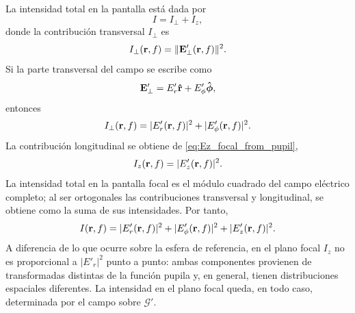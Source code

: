La intensidad total en la pantalla está dada por
\begin{equation}
  I
  =
  I_\perp
  +
  I_z,
  \label{eq:Intensity_in_Focal_Plane_decomp}
\end{equation}
donde la contribución transversal $I_\perp$ es
\begin{equation}
    I_\perp(\vb{r}, f)
    =
    \|\vb{E}'_\perp(\vb{r}, f)\|^2.
\end{equation}
Si la parte transversal del campo se escribe como
\begin{equation}
  \vb E'_\perp
  =
  E'_r \bm{\hat{\mathbf{r}}}
  +
  E'_\phi \bm{\hat{\mathbf{\phi}}} ,
\end{equation}
entonces
\begin{equation}
  I_\perp(\vb r, f)
  =
  |E'_r(\vb r, f)|^2
  +
  |E'_\phi(\vb r, f)|^2 .
\end{equation}
La contribución longitudinal se obtiene de \eqref{eq:Ez_focal_from_pupil},
\begin{equation}
  I_z(\vb r, f)
  =
  |E'_z(\vb r, f)|^2 .
\end{equation}
La intensidad total en la pantalla focal es el módulo cuadrado del campo eléctrico completo; al ser ortogonales las contribuciones transversal y longitudinal, se obtiene como la suma de sus intensidades. Por tanto,
\begin{equation}
  I(\vb r, f)
  =
  |E'_r(\vb r, f)|^2
  +
  |E'_\phi(\vb r, f)|^2
  +
  |E'_z(\vb r, f)|^2 .
  \label{eq:Intensity_in_Focal_Plane}
\end{equation}
A diferencia de lo que ocurre sobre la esfera de referencia, en el plano focal $I_z$ no es proporcional a $|E'_r|^2$ punto a punto: ambas componentes provienen de transformadas distintas de la función pupila y, en general, tienen distribuciones espaciales diferentes. La intensidad en el plano focal queda, en todo caso, determinada por el campo sobre $\mathscr G'$.

